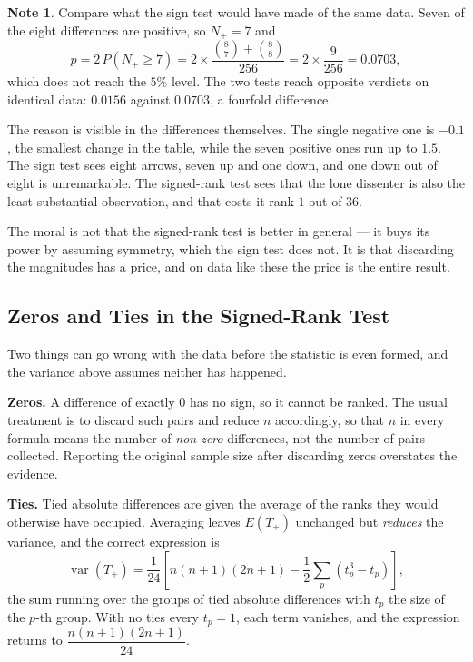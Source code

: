 \documentclass[11pt,a4paper]{article}
\theoremstyle{definition}
\newtheorem{note}[thm]{Note}
\begin{document}
\begin{note}
Compare what the sign test would have made of the same data. Seven of the eight
differences are positive, so $N_{+}=7$ and
$$p=2\,P\left(N_{+}\geq 7\right)
=2\times\dfrac{\binom{8}{7}+\binom{8}{8}}{256}=2\times\dfrac{9}{256}=0.0703 ,$$
which does not reach the $5\%$ level. The two tests reach opposite verdicts on
identical data: $0.0156$ against $0.0703$, a fourfold difference.

The reason is visible in the differences themselves. The single negative one is
$-0.1$, the smallest change in the table, while the seven positive ones run up to
$1.5$. The sign test sees eight arrows, seven up and one down, and one down out of
eight is unremarkable. The signed-rank test sees that the lone dissenter is also
the least substantial observation, and that costs it rank $1$ out of $36$.

The moral is not that the signed-rank test is better in general --- it buys its
power by assuming symmetry, which the sign test does not. It is that discarding
the magnitudes has a price, and on data like these the price is the entire result.
\end{note}

\subsection{Zeros and Ties in the Signed-Rank Test}
Two things can go wrong with the data before the statistic is even formed, and
the variance above assumes neither has happened.

\textbf{Zeros.} A difference of exactly $0$ has no sign, so it cannot be ranked.
The usual treatment is to discard such pairs and reduce $n$ accordingly, so that
$n$ in every formula means the number of \emph{non-zero} differences, not the
number of pairs collected. Reporting the original sample size after discarding
zeros overstates the evidence.

\textbf{Ties.} Tied absolute differences are given the average of the ranks they
would otherwise have occupied. Averaging leaves $E(T_+)$ unchanged but
\emph{reduces} the variance, and the correct expression is
$$\operatorname{var}(T_+) = \dfrac{1}{24}\left[
n(n+1)(2n+1) - \dfrac{1}{2}\sum_{p}\left(t_p^{3} - t_p\right)\right],$$
the sum running over the groups of tied absolute differences with $t_p$ the size
of the $p$-th group. With no ties every $t_p = 1$, each term vanishes, and the
expression returns to $\dfrac{n(n+1)(2n+1)}{24}$.
\end{document}
